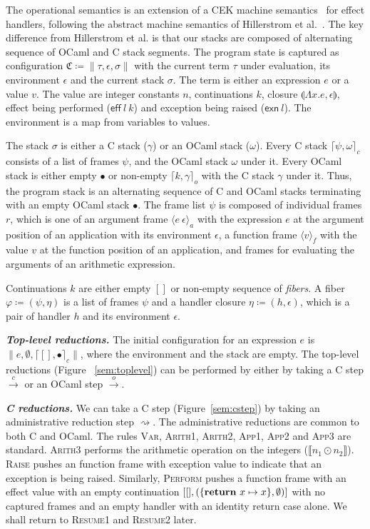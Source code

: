 \documentclass[sigplan,10pt,review,anonymous]{acmart}\settopmatter{printfolios=true,printccs=false,printacmref=false}
\newcommand{\lam}[2]{\Lambda #1. #2}
\newcommand{\env}{\epsilon}
\newcommand{\clos}[3]{\llparenthesis \lam{#1}{#2}, #3 \rrparenthesis}
\newcommand{\kw}[1]{\text{\bf #1}}
\newcommand{\effval}[2]{\textsf{eff} ~#1 ~#2}
\newcommand{\exnval}[1]{\textsf{exn} ~#1}
\newcommand{\caseval}[2]{\kw{return}~#1 \mapsto #2}
\newcommand{\farg}[2]{\langle #1 ~#2 \rangle_a}
\newcommand{\ffun}[1]{\langle #1 \rangle_f}
\newcommand{\fiber}{\varphi}
\newcommand{\fl}{\psi} %
\newcommand{\hc}{\eta} %
\newcommand{\cstack}{\gamma} %
\newcommand{\ostack}{\omega} %
\newcommand{\cstacka}[2]{\big \lceil #1, #2 \big \rceil_c} %
\newcommand{\ostacka}[2]{\big \lceil #1, #2 \big \rceil_o} %
\newcommand{\ostackemp}{\bullet}
\newcommand{\stack}{\sigma}
\newcommand{\config}{\mathfrak{C}}
\newcommand{\configa}[3]{\|#1,#2,#3\|}
\newcommand{\ostep}{\xrightarrow{o}}
\newcommand{\cstep}{\xrightarrow{c}}
\begin{document}
The operational semantics is an extension of a CEK machine
semantics~\cite{Felleisen86} for effect handlers, following the abstract
machine semantics of Hillerstrom et al.~\cite{Hillerstrom20}. The key
difference from Hillerstrom et al. is that our stacks are composed of
alternating sequence of OCaml and C stack segments. The program state is
captured as configuration $\config \coloneqq \configa{\tau}{\env}{\stack}$ with
the current term $\tau$ under evaluation, its environment $\env$ and the
current stack $\stack$. The term is either an expression $e$ or a value $v$.
The value are integer constants $n$, continuations $k$, closure
$\clos{x}{e}{\env}$, effect being performed ($\effval{l}{k}$) and exception
being raised ($\exnval{l}$). The environment is a map from variables to values.

The stack $\stack$ is either a C stack ($\cstack$) or an OCaml stack
($\ostack$). Every C stack $\cstacka{\fl}{\ostack}$ consists of a list of
frames $\fl$, and the OCaml stack $\ostack$ under it. Every OCaml stack is
either empty $\ostackemp$ or non-empty $\ostacka{k}{\cstack}$ with the C stack
$\cstack$ under it. Thus, the program stack is an alternating sequence of C and
OCaml stacks terminating with an empty OCaml stack $\ostackemp$. The frame list
$\fl$ is composed of individual frames $r$, which is one of an argument frame
$\farg{e}{\env}$ with the expression $e$ at the argument position of an
application with its environment $\env$, a function frame $\ffun{v}$ with the
value $v$ at the function position of an application, and frames for evaluating
the arguments of an arithmetic expression.

Continuations $k$ are either empty $[]$ or non-empty sequence of \emph{fibers}.
A fiber $\fiber \coloneqq (\fl,\hc)$ is a list of frames $\fl$ and a handler
closure $\hc \coloneqq (h,\env)$, which is a pair of handler $h$ and its
environment $\env$.

\textbf{\textit{Top-level reductions.}} The initial configuration for an expression
$e$ is $\configa{e}{\emptyset}{\cstacka{[]}{\bullet}}$, where the environment
and the stack are empty. The top-level reductions (Figure ~\ref{sem:toplevel})
can be performed by either by taking a C step $\cstep$ or an OCaml step
$\ostep$.

\textbf{\textit{C reductions.}} We can take a C step (Figure~\ref{sem:cstep}) by
taking an administrative reduction step $\rightsquigarrow$. The administrative
reductions are common to both C and OCaml. The rules \textsc{Var},
\textsc{Arith1}, \textsc{Arith2}, \textsc{App1}, \textsc{App2} and
\textsc{App3} are standard. \textsc{Arith3} performs the arithmetic operation
on the integers ($\llbracket n_1 \odot n_2 \rrbracket$). \textsc{Raise} pushes
an function frame with exception value to indicate that an exception is being
raised. Similarly, \textsc{Perform} pushes a function frame with an effect
value with an empty continuation $[[],(\{\caseval{x}{x}\},\emptyset)]$ with no
captured frames and an empty handler with an identity return case alone. We
shall return to \textsc{Resume1} and \textsc{Resume2} later.
\end{document}
